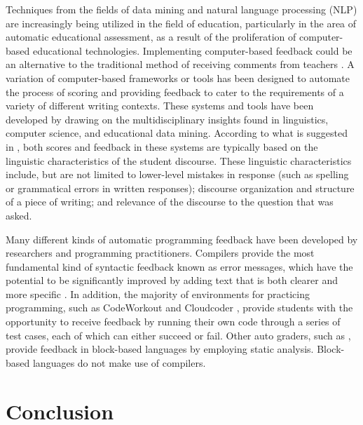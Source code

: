 Techniques from the fields of data mining and natural language processing (NLP) are increasingly being utilized in the field of education, particularly in the area of automatic educational assessment, as a result of the proliferation of computer-based educational technologies. Implementing computer-based feedback could be an alternative to the traditional method of receiving comments from teachers \cite{ref56}. A variation of computer-based frameworks or tools has been designed to automate the process of scoring and providing feedback to cater to the requirements of a variety of different writing contexts. These systems and tools have been developed by drawing on the multidisciplinary insights found in linguistics, computer science, and educational data mining. According to what is suggested in \cite{ref57}, both scores and feedback in these systems are typically based on the linguistic characteristics of the student discourse. These linguistic characteristics include, but are not limited to lower-level mistakes in response (such as spelling or grammatical errors in written responses); discourse organization and structure of a piece of writing; and relevance of the discourse to the question that was asked.\par  
Many different kinds of automatic programming feedback have been developed by researchers and programming practitioners. Compilers provide the most fundamental kind of syntactic feedback known as error messages, which have the potential to be significantly improved by adding text that is both clearer and more specific \cite{ref58, ref59}. In addition, the majority of environments for practicing programming, such as CodeWorkout \cite{ref60} and Cloudcoder \cite{ref61}, provide students with the opportunity to receive feedback by running their own code through a series of test cases, each of which can either succeed or fail. Other auto graders, such as \cite{ref62, ref63}, provide feedback in block-based languages by employing static analysis. Block-based languages do not make use of compilers.

\section{Conclusion} 


